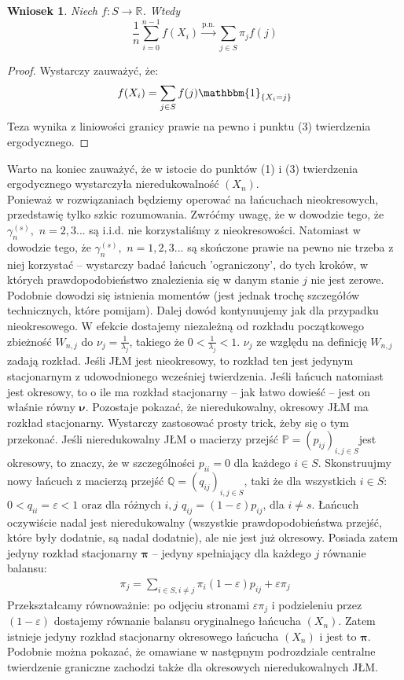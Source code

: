 \documentclass[a4paper]{article}
\theoremstyle{defn}
\theoremstyle{theorem}
\theoremstyle{lemma}
\theoremstyle{cor}
\newtheorem{cor}[defn]{Wniosek}
\theoremstyle{fact}
\begin{document}
\begin{cor}\label{cor2.5.14}
Niech $f: S \to \mathbb{R}$. Wtedy
$$ \frac{1}{n} \sum\limits_{i=0}^{n-1} f(X_i) \overset{\text{p.n.}}{\to} \sum\limits_{j \in S} \pi_j f(j)$$
\end{cor}
\begin{proof}
Wystarczy zauważyć, że:
$$ f(X_i) = \sum\limits_{j \in S} f(j)\mathbbm{1}_{\{X_i = j\}}$$
Teza wynika z liniowości granicy prawie na pewno i punktu (3) twierdzenia ergodycznego.
\end{proof}
Warto na koniec zauważyć, że w istocie do punktów (1) i (3) twierdzenia ergodycznego wystarczyła nieredukowalność $(X_n)$. \\
Ponieważ w rozwiązaniach będziemy operować na łańcuchach nieokresowych, przedstawię tylko szkic rozumowania. Zwróćmy uwagę, że w dowodzie tego, że $\gamma_n^{(s)},\,\, n = 2,3...$ są i.i.d. nie korzystaliśmy z nieokresowości. Natomiast w dowodzie tego, że $\gamma_n^{(s)},\,\, n = 1,2,3...$ są skończone prawie na pewno nie trzeba z niej korzystać – wystarczy badać łańcuch 'ograniczony', do tych kroków, w których prawdopodobieństwo znalezienia się w danym stanie $j$ nie jest zerowe. Podobnie dowodzi się istnienia momentów (jest jednak trochę szczegółów technicznych, które pomijam). Dalej dowód kontynuujemy jak dla przypadku nieokresowego. W efekcie dostajemy niezależną od rozkładu początkowego zbieżność $W_{n,j}$ do $\nu_j = \frac{1}{\lambda_j}$, takiego że $0 < \frac{1}{\lambda_j} < 1$. $\nu_j$ ze względu na definicję $W_{n,j}$ zadają rozkład. Jeśli JŁM jest nieokresowy, to rozkład ten jest jedynym stacjonarnym z udowodnionego wcześniej twierdzenia. Jeśli łańcuch natomiast jest okresowy, to o ile ma rozkład stacjonarny – jak łatwo dowieść – jest on właśnie równy $\boldsymbol{\nu}$. Pozostaje pokazać, że nieredukowalny, okresowy JŁM ma rozkład stacjonarny. Wystarczy zastosować prosty trick, żeby się o tym przekonać. Jeśli nieredukowalny JŁM o macierzy przejść $\mathbb{P} = (p_{ij})_{i,j \in S}$jest okresowy, to znaczy, że w szczególności $p_{ii} = 0$ dla każdego $i \in S$. Skonstruujmy nowy łańcuch z macierzą przejść $\mathbb{Q} = (q_{ij})_{i,j \in S}$, taki że dla wszystkich $i \in S$: $0 < q_{ii} = \varepsilon < 1$ oraz dla różnych $i,j$ $q_{ij} = (1-\varepsilon)p_{ij}$, dla $i \neq s$. Łańcuch oczywiście nadal jest nieredukowalny (wszystkie prawdopodobieństwa przejść, które były dodatnie, są nadal dodatnie), ale nie jest już okresowy. Posiada zatem jedyny rozkład stacjonarny $\boldsymbol{\pi}$ – jedyny spełniający dla każdego $j$ równanie balansu:
\begin{align*}
    \pi_j = \sum\limits_{i \in S, i \neq j} \pi_i (1-\varepsilon) p_{ij}  + \varepsilon \pi_j
\end{align*}
Przekształcamy równoważnie: po odjęciu stronami $\varepsilon \pi_j$ i podzieleniu przez $(1-\varepsilon)$ dostajemy równanie balansu oryginalnego łańcucha $(X_n)$. Zatem istnieje jedyny rozkład stacjonarny okresowego łańcucha $(X_n)$ i jest to $\boldsymbol{\pi}$.
\\
Podobnie można pokazać, że omawiane w następnym podrozdziale centralne twierdzenie graniczne zachodzi także dla okresowych nieredukowalnych JŁM.
\end{document}
